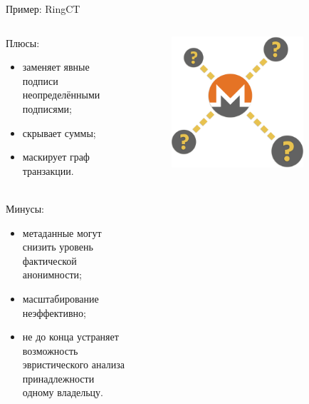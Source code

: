 \documentclass[aspectratio=169]{beamer}
\begin{document}
\begin{frame}{Пример: RingCT}
\begin{columns}
\begin{column}{0.7\textwidth}
Плюсы:
\begin{itemize}
\item заменяет явные подписи неопределёнными подписями;
\item скрывает суммы;
\item маскирует граф транзакции. \\~\\
\end{itemize}

Минусы:
\begin{itemize}
\item метаданные могут снизить уровень фактической анонимности;
\item масштабирование неэффективно;
\item не до конца устраняет возможность эвристического анализа принадлежности одному владельцу.
\end{itemize}
\end{column}
\begin{column}{0.3\textwidth}
\begin{figure}
\includegraphics[width=0.8\textwidth]{ambiguous.png}
\end{figure}
\end{column}
\end{columns}
\end{frame}
\end{document}
